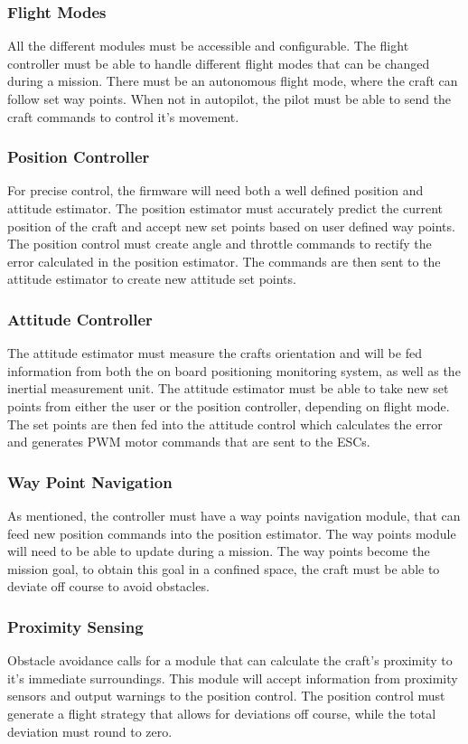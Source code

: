 			\subsubsection{Flight Modes}
			All the different modules must be accessible and configurable. The flight controller must be able to handle different flight modes that can be changed during a mission. There must be an autonomous flight mode, where the craft can follow set way points. When not in autopilot, the pilot must be able to send the craft commands to control it's movement. 
			
			\subsubsection{Position Controller}
			For precise control, the firmware will need both a well defined position and attitude estimator. 
			The position estimator must accurately predict the current position of the craft and accept new set points based on user defined way points. 
			The position control must create angle and throttle commands to rectify the error calculated in the position estimator. The commands are then sent to the attitude estimator to create new attitude set points. 
			
			\subsubsection{Attitude Controller}
			The attitude estimator must measure the crafts orientation and will be fed information from both the on board positioning monitoring system, as well as the inertial measurement unit. The attitude estimator must be able to take new set points from either the user or the position controller, depending on flight mode. The set points are then fed into the attitude control which calculates the error and generates PWM motor commands that are sent to the ESCs.
			
			\subsubsection{Way Point Navigation}
			As mentioned, the controller must have a way points navigation module, that can feed new position commands into the position estimator. The way points module will need to be able to update during a mission. The way points become the mission goal, to obtain this goal in a confined space, the craft must be able to deviate off course to avoid obstacles. 
			
			\subsubsection{Proximity Sensing}
			Obstacle avoidance calls for a module that can calculate the craft's proximity to it's immediate surroundings. This module will accept information from proximity sensors and output warnings to the position control. The position control must generate a flight strategy that allows for deviations off course, while the total deviation must round to zero.
					

